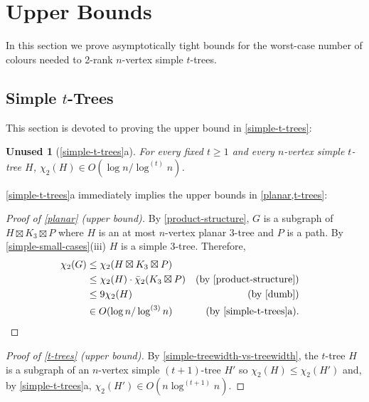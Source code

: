 \documentclass[kpfonts]{patmorin}
\newcommand{\trn}{\chi_2}
\newcommand{\dtcn}{\bar{\chi}_2}
\theoremstyle{named}
\newtheorem*{namedtheorem}{Unused}
\newcommand{\weirdref}[2]{\cref{#1}#2}
\newcommand{\weirdlabel}[2]{\label{#1-#1}}
\begin{document}
\section{Upper Bounds}
\label{upper-bounds}

In this section we prove asymptotically tight bounds for the worst-case number of colours needed to 2-rank $n$-vertex simple $t$-trees.

\subsection{Simple $t$-Trees}

This section is devoted to proving the upper bound in \cref{simple-t-trees}:

\begin{namedtheorem}[\weirdref{simple-t-trees}{a}]\weirdlabel{simple-t-trees}{a}
    For every fixed $t\ge 1$ and every $n$-vertex simple $t$-tree $H$, $\trn(H)\in O(\log n/\log^{(t)} n)$.
\end{namedtheorem}

\weirdref{simple-t-trees}{a} immediately implies the upper bounds in \cref{planar,t-trees}:

\begin{proof}[Proof of \cref{planar} (upper bound)]
    By \cref{product-structure}, $G$ is a subgraph of $H\boxtimes K_3\boxtimes P$ where $H$ is an at most $n$-vertex planar 3-tree and $P$ is a path. By \cref{simple-small-cases}(iii) $H$ is a simple 3-tree. Therefore,
    \begin{align*}
        \trn(G) & \le \trn(H\boxtimes K_3\boxtimes P) \\
                & \le \trn(H)\cdot \dtcn(K_3\boxtimes P)
                    & \text{(by \cref{product-structure})}\\
                & \le 9\trn(H) & \text{(by \cref{dumb})} \\
                & \in O(\log n/\log^{(3)} n) & \text{(by \weirdref{simple-t-trees}{a}).} & \qedhere
    \end{align*}
\end{proof}

\begin{proof}[Proof of \cref{t-trees} (upper bound)]
    By \cref{simple-treewidth-vs-treewidth}, the $t$-tree $H$ is a subgraph of an $n$-vertex simple $(t+1)$-tree $H'$ so $\trn(H)\le \trn(H')$ and, by   \weirdref{simple-t-trees}{a}, $\trn(H')\in O(n\log^{(t+1)}n)$.
\end{proof}
\end{document}
